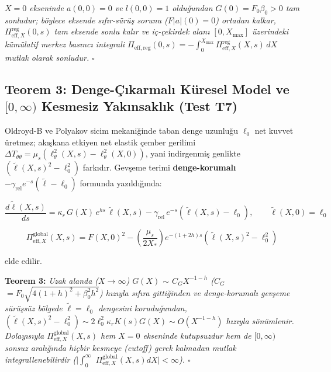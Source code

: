 \documentclass[12pt,a4paper]{article}
\begin{document}
\textit{$X = 0$ ekseninde $a(0, 0) = 0$ ve $l(0, 0) = 1$ olduğundan $G(0) = F_0 \beta_0 > 0$ tam sonludur; böylece eksende sıfır-sürüş sorunu ($F|a|(0) = 0$) ortadan kalkar, $\Pi_{\mathrm{eff}, X}^{\mathrm{reg}}(0, s)$ tam eksende sonlu kalır ve iç-çekirdek alanı $[0, X_{\max}]$ üzerindeki kümülatif merkez basıncı integrali $\Pi_{\mathrm{eff,reg}}(0, s) = -\int_0^{X_{\max}} \Pi_{\mathrm{eff}, X}^{\mathrm{reg}}(X, s) \, dX$ mutlak olarak sonludur. $\square$}

\subsection{Teorem 3: Denge-Çıkarmalı Küresel Model ve $[0,\infty)$ Kesmesiz Yakınsaklık (Test T7)}

Oldroyd-B ve Polyakov sicim mekaniğinde taban denge uzunluğu $\ell_0$ net kuvvet üretmez; akışkana etkiyen net elastik çember gerilimi $\Delta T_{\theta\theta} = \mu_s (\ell_\theta^2(X,s) - \ell_\theta^2(X,0))$, yani indirgenmiş genlikte $(\tilde{\ell}(X,s)^2 - \ell_0^2)$ farkıdır. Gevşeme terimi \textbf{denge-korumalı} $-\gamma_{\mathrm{rel}} e^{-s} (\tilde{\ell} - \ell_0)$ formunda yazıldığında:

\begin{equation}
\frac{d \tilde{\ell}(X, s)}{ds} = \kappa_r \, G(X) \, e^{h s} \, \tilde{\ell}(X, s) - \gamma_{\mathrm{rel}} \, e^{-s} \left( \tilde{\ell}(X, s) - \ell_0 \right), \qquad \tilde{\ell}(X, 0) = \ell_0
\end{equation}

\begin{equation}
\Pi_{\mathrm{eff}, X}^{\mathrm{global}}(X, s) = F(X, 0)^2 - \left( \frac{\mu_s}{2 X_*} \right) e^{-(1+2h)s} \left( \tilde{\ell}(X, s)^2 - \ell_0^2 \right)
\end{equation}

elde edilir.

\textbf{Teorem 3:} \textit{Uzak alanda ($X \to \infty$) $G(X)$ $\sim$ $C_G X^{-1-h}$ ($C_G$ $= F_0 \sqrt{4(1+h)^2 + \beta_0^2 h^2}$) hızıyla sıfıra gittiğinden ve denge-korumalı gevşeme sürüşsüz bölgede $\tilde{\ell} = \ell_0$ dengesini koruduğundan, $(\tilde{\ell}(X, s)^2 - \ell_0^2) \sim 2 \ell_0^2 \kappa_r K(s) G(X) \sim O(X^{-1-h})$ hızıyla sönümlenir. Dolayısıyla $\Pi_{\mathrm{eff}, X}^{\mathrm{global}}(X, s)$ hem $X = 0$ ekseninde kutupsuzdur hem de $[0, \infty)$ sonsuz aralığında hiçbir kesmeye (\textit{cutoff}) gerek kalmadan mutlak integrallenebilirdir ($\bigg\vert{}\int_0^\infty$ $\Pi_{\mathrm{eff}, X}^{\mathrm{global}}(X, s) dX\bigg\vert{} < \infty$). $\square$}
\end{document}
